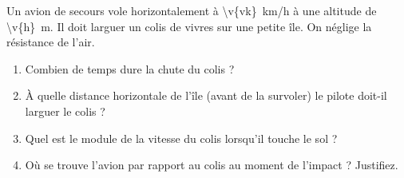 Un avion de secours vole horizontalement à \qty{\v{vk}}{km/h} à une altitude de \qty{\v{h}}{m}. Il doit larguer un colis de vivres sur une petite île. On néglige la résistance de l'air.

\begin{enumerate}[label=\alph*)]
    \item Combien de temps dure la chute du colis ?
    \item À quelle distance horizontale de l'île (avant de la survoler) le pilote doit-il larguer le colis ?
    \item Quel est le module de la vitesse du colis lorsqu'il touche le sol ?
    \item Où se trouve l'avion par rapport au colis au moment de l'impact ? Justifiez.
\end{enumerate}
